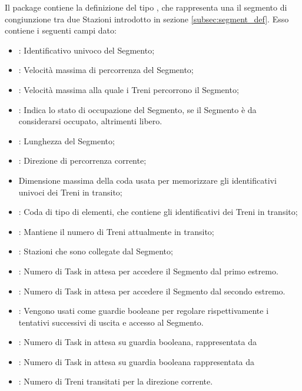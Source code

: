 	Il package  contiene la definizione del tipo ,  che rappresenta una il segmento di congiunzione tra due Stazioni introdotto in sezione \ref{subsec:segment_def}. Esso contiene i seguenti campi dato:
	\begin{itemize}
		
		\item {}: Identificativo univoco del Segmento;
		\item {}: Velocità massima di percorrenza del Segmento;
		\item {}: Velocità massima alla quale i Treni percorrono il Segmento;
		\item {}: Indica lo stato di occupazione del Segmento, se  il Segmento è da considerarsi occupato, altrimenti libero.
		\item {}: Lunghezza del Segmento;
		
		\item {}: Direzione di percorrenza corrente;
		
		\item {} Dimensione massima della coda usata per memorizzare gli identificativi univoci dei Treni in transito;
		\item {}: Coda di tipo  di  elementi, che contiene gli identificativi dei Treni in transito;
		\item {}: Mantiene il numero di Treni attualmente in transito;
		
		
		\item {}: Stazioni che sono collegate dal Segmento; 
		
		\item {}: Numero di Task in attesa per accedere il Segmento dal primo estremo.
		\item {}: Numero di Task in attesa per accedere il Segmento dal secondo estremo.
		
		\item {}: Vengono usati come guardie booleane per regolare rispettivamente i tentativi successivi di uscita e accesso al Segmento.
		
		\item {}: Numero di Task in attesa su guardia booleana, rappresentata da 
		\item {}: Numero di Task in attesa su guardia booleana rappresentata da  

		\item {}: Numero di Treni transitati per la direzione corrente.		
		
	\end{itemize}
	
